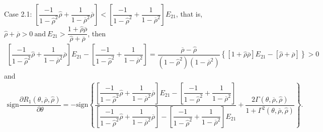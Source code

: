\documentclass[10pt]{article}
\begin{document}
Case 2.1: {\footnotesize $ \left[ \dfrac{- 1}{1 - {\hat \rho}^2} {\hat \rho} + \dfrac1{1 - \overline{\rho}^2} \overline{\rho} \right] < \left[ \dfrac{- 1}{1 - {\hat \rho}^2} + \dfrac1{1 - \overline{\rho}^2} \right] E_{2 1} $}, that is, {\footnotesize $ {\hat \rho} + \overline{\rho} > 0 \ \text{and} \ E_{2 1} > \dfrac{1 + {\hat \rho} \overline{\rho}}{{\hat \rho} + \overline{\rho}} $}, then
{\footnotesize \begin{eqnarray*}
\left[ \dfrac{- 1}{1 - {\hat \rho}^2} {\hat \rho} + \dfrac1{1 - \overline{\rho}^2} \overline{\rho} \right] E_{2 1} - \left[ \dfrac{- 1}{1 - {\hat \rho}^2} + \dfrac1{1 - \overline{\rho}^2} \right] = \dfrac{\overline{\rho} - {\hat \rho}}{(1 - {\hat \rho}^2) (1 - \overline{\rho}^2)} \left\{ \left[ 1 + {\hat \rho} \overline{\rho} \right] E_{2 1} - \left[ {\hat \rho} + \overline{\rho} \right] \right\} > 0
\end{eqnarray*}}
and
{\footnotesize \begin{eqnarray*}
\text{sign} \dfrac{\partial R_1 (\theta, \overline{\rho}, {\hat \rho})}{\partial \theta} = - \text{sign} \left\{ \dfrac{\left[ \dfrac{- 1}{1 - {\hat \rho}^2} {\hat \rho} + \dfrac1{1 - \overline{\rho}^2} \overline{\rho} \right] E_{2 1} - \left[ \dfrac{- 1}{1 - {\hat \rho}^2} + \dfrac1{1 - \overline{\rho}^2} \right]}{\left[ \dfrac{- 1}{1 - {\hat \rho}^2} {\hat \rho} + \dfrac1{1 - \overline{\rho}^2} \overline{\rho} \right] - \left[ \dfrac{- 1}{1 - {\hat \rho}^2} + \dfrac1{1 - \overline{\rho}^2} \right] E_{2 1}} + \dfrac{2 \Gamma (\theta, \overline{\rho}, {\hat \rho})}{1 + \Gamma^2 (\theta, \overline{\rho}, {\hat \rho})} \right\}.
\end{eqnarray*}}
\end{document}
